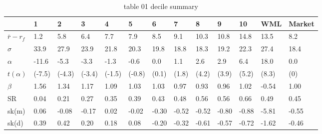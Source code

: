 \begin{table}[htbp]
  \centering
  \caption{table 01 decile summary}
  \label{tab:table_01_decile_summary}
  \begin{tabular}{lllllllllllll}
\toprule
 & 1 & 2 & 3 & 4 & 5 & 6 & 7 & 8 & 9 & 10 & WML & Market \\
\midrule
$\bar{r} - r_f$ & 1.2 & 5.8 & 6.4 & 7.7 & 7.9 & 8.5 & 9.1 & 10.3 & 10.8 & 14.8 & 13.5 & 8.2 \\
$\sigma$ & 33.9 & 27.9 & 23.9 & 21.8 & 20.3 & 19.8 & 18.8 & 18.3 & 19.2 & 22.3 & 27.4 & 18.4 \\
$\alpha$ & -11.6 & -5.3 & -3.3 & -1.3 & -0.6 & 0.0 & 1.1 & 2.6 & 2.9 & 6.4 & 18.0 & 0.0 \\
$t(\alpha)$ & (-7.5) & (-4.3) & (-3.4) & (-1.5) & (-0.8) & (0.1) & (1.8) & (4.2) & (3.9) & (5.2) & (8.3) & (0) \\
$\beta$ & 1.56 & 1.34 & 1.17 & 1.09 & 1.03 & 1.03 & 0.97 & 0.93 & 0.96 & 1.02 & -0.54 & 1.00 \\
SR & 0.04 & 0.21 & 0.27 & 0.35 & 0.39 & 0.43 & 0.48 & 0.56 & 0.56 & 0.66 & 0.49 & 0.45 \\
sk(m) & 0.06 & -0.08 & -0.17 & 0.02 & -0.02 & -0.30 & -0.52 & -0.52 & -0.80 & -0.88 & -5.81 & -0.55 \\
sk(d) & 0.39 & 0.42 & 0.20 & 0.18 & 0.08 & -0.20 & -0.32 & -0.61 & -0.57 & -0.72 & -1.62 & -0.46 \\
\bottomrule
\end{tabular}

\end{table}
